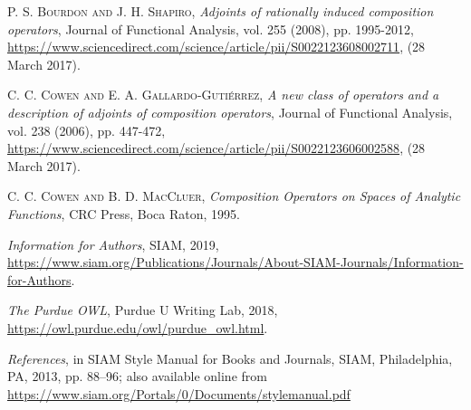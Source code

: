 \documentclass{article}
\begin{document}

\begin{thebibliography}{99}

  \textsc{P. S. Bourdon and J. H. Shapiro},
  \emph{Adjoints of rationally induced composition operators},
  Journal of Functional Analysis, vol. 255 (2008), pp. 1995-2012, 
  \url{https://www.sciencedirect.com/science/article/pii/S0022123608002711}, (28 March 2017).

  \textsc{C. C. Cowen and E. A. Gallardo-Guti\'{e}rrez},
  \emph{A new class of operators and a description of adjoints of composition operators},
  Journal of Functional Analysis, vol. 238 (2006), pp. 447-472,
  \url{https://www.sciencedirect.com/science/article/pii/S0022123606002588}, (28 March 2017).

  \textsc{C. C. Cowen and B. D. MacCluer},
  \emph{Composition Operators on Spaces of Analytic Functions},
  CRC Press, Boca Raton,
  1995.
  
  \emph{Information for Authors},
  SIAM, 
  2019, 
  \url{https://www.siam.org/Publications/Journals/About-SIAM-Journals/Information-for-Authors}.
  
  \emph{The Purdue OWL},
  Purdue U Writing Lab,
  2018,
  \url{https://owl.purdue.edu/owl/purdue_owl.html}.
  
  \emph{References},
  in SIAM Style Manual for Books and Journals,
  SIAM, Philadelphia, PA, 2013, pp. 88--96; also available online from
  \url{https://www.siam.org/Portals/0/Documents/stylemanual.pdf}
  
\end{thebibliography}
\end{document}
